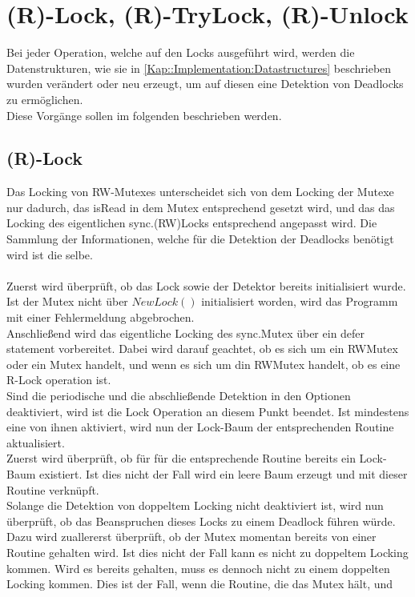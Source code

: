 \section{(R)-Lock, (R)-TryLock, (R)-Unlock}
Bei jeder Operation, welche auf den Locks ausgeführt wird, werden die Datenstrukturen,
wie sie in \ref{Kap::Implementation:Datastructures} beschrieben wurden verändert
oder neu erzeugt, um auf diesen eine Detektion von Deadlocks zu ermöglichen.\\
Diese Vorgänge sollen im folgenden beschrieben werden.
\subsection{(R)-Lock}
Das Locking von RW-Mutexes unterscheidet sich von dem Locking der Mutexe nur
dadurch, das isRead in dem Mutex entsprechend gesetzt wird, und das das 
Locking des eigentlichen sync.(RW)Locks entsprechend angepasst wird. Die 
Sammlung der Informationen, welche für die Detektion der Deadlocks benötigt
wird ist die selbe.\\\\
Zuerst wird überprüft, ob das Lock sowie der Detektor bereits initialisiert 
wurde. Ist der Mutex nicht über $NewLock()$ initialisiert worden, wird das 
Programm mit einer Fehlermeldung abgebrochen. \\
Anschließend wird das eigentliche Locking des sync.Mutex über ein defer 
statement vorbereitet. Dabei wird darauf geachtet, ob es sich um ein RWMutex
oder ein Mutex handelt, und wenn es sich um din RWMutex handelt, ob es eine 
R-Lock operation ist.\\
Sind die periodische und die abschließende Detektion in den Optionen deaktiviert,
wird ist die Lock Operation an diesem Punkt beendet. Ist mindestens eine von 
ihnen aktiviert, wird nun der Lock-Baum der entsprechenden Routine aktualisiert.\\
Zuerst wird überprüft, ob für für die entsprechende Routine bereits ein 
Lock-Baum existiert. Ist dies nicht der Fall wird ein leere Baum erzeugt und 
mit dieser Routine verknüpft.\\
Solange die Detektion von doppeltem Locking nicht deaktiviert ist, wird nun
überprüft, ob das Beanspruchen dieses Locks zu einem Deadlock führen würde.
Dazu wird zuallererst überprüft, ob der Mutex momentan bereits von einer 
Routine gehalten wird. Ist dies nicht der Fall kann es nicht zu doppeltem Locking 
kommen. Wird es bereits gehalten, muss es dennoch nicht zu einem doppelten 
Locking kommen. Dies ist der Fall, wenn die Routine, die das Mutex hält, und 
